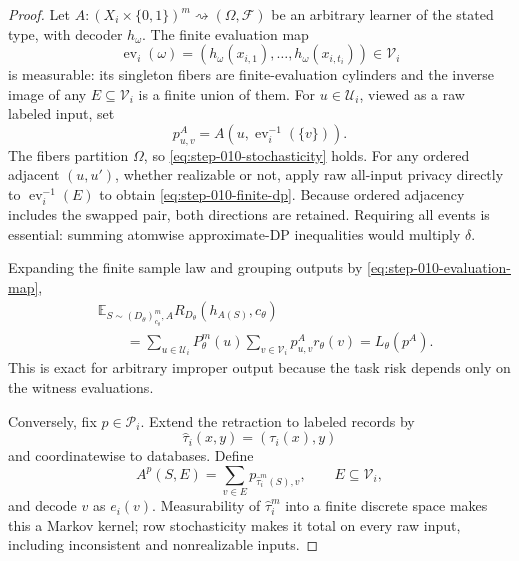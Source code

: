 \begin{proof}
Let \(A:(X_i\times\{0,1\})^m\rightsquigarrow(\Omega,\mathscr F)\) be
an arbitrary learner of the stated type, with decoder \(h_\omega\).  The
finite evaluation map
\begin{equation}\label{eq:step-010-evaluation-map}
\operatorname{ev}_i(\omega)
=(h_\omega(x_{i,1}),\ldots,h_\omega(x_{i,t_i}))
\in\mathcal V_i
\end{equation}
is measurable: its singleton fibers are finite-evaluation cylinders and
the inverse image of any \(E\subseteq\mathcal V_i\) is a finite union of
them.  For \(u\in\mathcal U_i\), viewed as a raw labeled input, set
\begin{equation}\label{eq:step-010-restricted-kernel}
p^A_{u,v}=A(u,\operatorname{ev}_i^{-1}(\{v\})).
\end{equation}
The fibers partition \(\Omega\), so
\eqref{eq:step-010-stochasticity} holds.  For any ordered adjacent
\((u,u')\), whether realizable or not, apply raw all-input privacy directly
to \(\operatorname{ev}_i^{-1}(E)\) to obtain
\eqref{eq:step-010-finite-dp}.  Because ordered adjacency includes the
swapped pair, both directions are retained.  Requiring all events is
essential: summing atomwise approximate-DP inequalities would multiply
\(\delta\).

Expanding the finite sample law and grouping outputs by
\eqref{eq:step-010-evaluation-map},
\begin{equation}\label{eq:step-010-restriction-payoff}
\begin{split}
&\mathbb E_{S\sim(D_\theta)_{c_\theta}^m,A}
R_{D_\theta}(h_{A(S)},c_\theta)\\
&\qquad=\sum_{u\in\mathcal U_i}P_\theta^m(u)
\sum_{v\in\mathcal V_i}p^A_{u,v}r_\theta(v)
=L_\theta(p^A).
\end{split}
\end{equation}
This is exact for arbitrary improper output because the task risk depends
only on the witness evaluations.

Conversely, fix \(p\in\mathcal P_i\).  Extend the retraction to labeled
records by
\begin{equation}\label{eq:step-010-labeled-retraction}
\widehat\tau_i(x,y)=(\tau_i(x),y)
\end{equation}
and coordinatewise to databases.  Define
\begin{equation}\label{eq:step-010-extended-kernel}
A^p(S,E)=\sum_{v\in E}p_{\widehat\tau_i^m(S),v},
\qquad E\subseteq\mathcal V_i,
\end{equation}
and decode \(v\) as \(e_i(v)\).  Measurability of
\(\widehat\tau_i^m\) into a finite discrete space makes this a Markov
kernel; row stochasticity makes it total on every raw input, including
inconsistent and nonrealizable inputs.


\end{proof}

